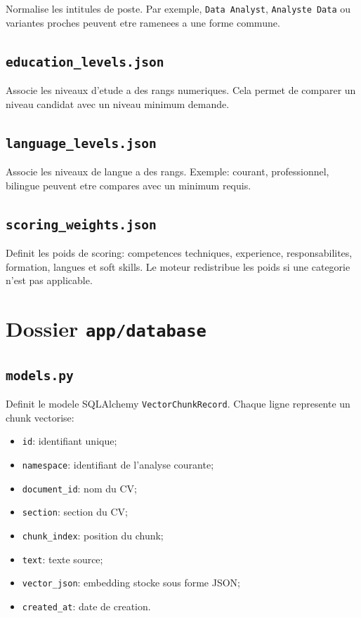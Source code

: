 \documentclass[12pt,a4paper]{article}
\begin{document}
Normalise les intitules de poste. Par exemple, \texttt{Data Analyst}, \texttt{Analyste Data} ou variantes proches peuvent etre ramenees a une forme commune.

\subsection{\texttt{education\_levels.json}}

Associe les niveaux d'etude a des rangs numeriques. Cela permet de comparer un niveau candidat avec un niveau minimum demande.

\subsection{\texttt{language\_levels.json}}

Associe les niveaux de langue a des rangs. Exemple: courant, professionnel, bilingue peuvent etre compares avec un minimum requis.

\subsection{\texttt{scoring\_weights.json}}

Definit les poids de scoring: competences techniques, experience, responsabilites, formation, langues et soft skills. Le moteur redistribue les poids si une categorie n'est pas applicable.

\section{Dossier \texttt{app/database}}

\subsection{\texttt{models.py}}

Definit le modele SQLAlchemy \texttt{VectorChunkRecord}. Chaque ligne represente un chunk vectorise:

\begin{itemize}
  \item \texttt{id}: identifiant unique;
  \item \texttt{namespace}: identifiant de l'analyse courante;
  \item \texttt{document\_id}: nom du CV;
  \item \texttt{section}: section du CV;
  \item \texttt{chunk\_index}: position du chunk;
  \item \texttt{text}: texte source;
  \item \texttt{vector\_json}: embedding stocke sous forme JSON;
  \item \texttt{created\_at}: date de creation.
\end{itemize}
\end{document}
